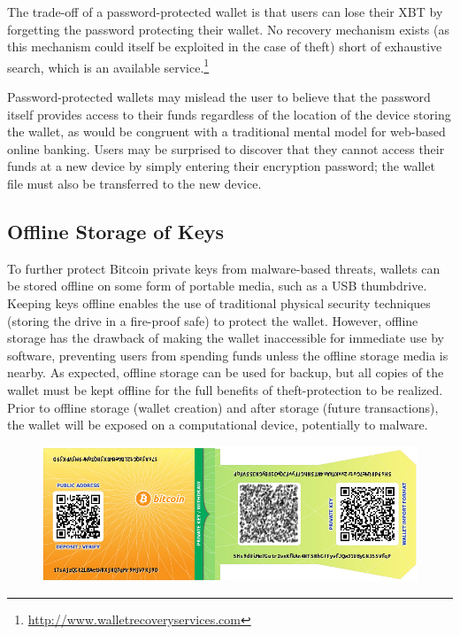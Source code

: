 The trade-off of a password-protected wallet is that users can lose their XBT by forgetting the password protecting their wallet. No recovery mechanism exists (as this mechanism could itself be exploited in the case of theft) short of exhaustive search, which is an available service.\footnote{\url{http://www.walletrecoveryservices.com}}

Password-protected wallets may mislead the user to believe that the password itself provides access to their funds regardless of the location of the device storing the wallet, as would be congruent with a traditional mental model for web-based online banking. Users may be surprised to discover that they cannot access their funds at a new device by simply entering their encryption password; the wallet file must also be transferred to the new device. 

\subsection{Offline Storage of Keys}
\label{sec:offline storage}
To further protect Bitcoin private keys from malware-based threats, wallets can be stored offline on some form of portable media, such as a USB thumbdrive. Keeping keys offline enables the use of traditional physical security techniques (\eg storing the drive in a fire-proof safe) to protect the wallet. However, offline storage has the drawback of making the wallet inaccessible for immediate use by software, preventing users from spending funds unless the offline storage media is nearby. As expected, offline storage can be used for backup, but all copies of the wallet must be kept offline for the full benefits of theft-protection to be realized. Prior to offline storage (wallet creation) and after storage (future transactions), the wallet will be exposed on a computational device, potentially to malware. 

\begin{figure}[htb]
  \includegraphics[width=\linewidth]{fig/paperwallet.png}
  \label{fig:paperwallet}
\end{figure}

